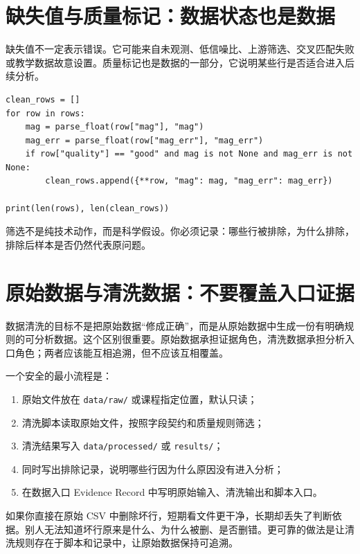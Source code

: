 \section{缺失值与质量标记：数据状态也是数据}

缺失值不一定表示错误。它可能来自未观测、低信噪比、上游筛选、交叉匹配失败或教学数据故意设置。质量标记也是数据的一部分，它说明某些行是否适合进入后续分析。

\begin{examplebox}[按质量标记筛选]
\begin{lstlisting}[style=pythonstyle]
clean_rows = []
for row in rows:
    mag = parse_float(row["mag"], "mag")
    mag_err = parse_float(row["mag_err"], "mag_err")
    if row["quality"] == "good" and mag is not None and mag_err is not None:
        clean_rows.append({**row, "mag": mag, "mag_err": mag_err})

print(len(rows), len(clean_rows))
\end{lstlisting}
\end{examplebox}

筛选不是纯技术动作，而是科学假设。你必须记录：哪些行被排除，为什么排除，排除后样本是否仍然代表原问题。

\section{原始数据与清洗数据：不要覆盖入口证据}

数据清洗的目标不是把原始数据“修成正确”，而是从原始数据中生成一份有明确规则的可分析数据。这个区别很重要。原始数据承担证据角色，清洗数据承担分析入口角色；两者应该能互相追溯，但不应该互相覆盖。

一个安全的最小流程是：

\begin{enumerate}
    \item 原始文件放在 \texttt{data/raw/} 或课程指定位置，默认只读；
    \item 清洗脚本读取原始文件，按照字段契约和质量规则筛选；
    \item 清洗结果写入 \texttt{data/processed/} 或 \texttt{results/}；
    \item 同时写出排除记录，说明哪些行因为什么原因没有进入分析；
    \item 在数据入口 Evidence Record 中写明原始输入、清洗输出和脚本入口。
\end{enumerate}

如果你直接在原始 CSV 中删除坏行，短期看文件更干净，长期却丢失了判断依据。别人无法知道坏行原来是什么、为什么被删、是否删错。更可靠的做法是让清洗规则存在于脚本和记录中，让原始数据保持可追溯。

